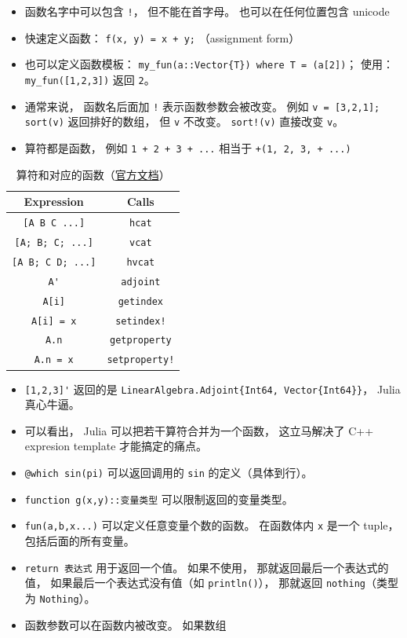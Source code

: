
\begin{issues}
\issueDraft
\end{issues}

\begin{itemize}
\item 函数名字中可以包含 \verb`!`， 但不能在首字母。 也可以在任何位置包含 unicode
\item 快速定义函数： \verb`f(x, y) = x + y;` （assignment form）
\item 也可以定义函数模板： \verb`my_fun(a::Vector{T}) where T = (a[2])`； 使用： \verb`my_fun([1,2,3])` 返回 \verb`2`。
\item 通常来说， 函数名后面加 \verb`!` 表示函数参数会被改变。 例如 \verb`v = [3,2,1]; sort(v)` 返回排好的数组， 但 \verb`v` 不改变。 \verb`sort!(v)` 直接改变 \verb`v`。
\item 算符都是函数， 例如 \verb`1 + 2 + 3 + ...` 相当于 \verb`+(1, 2, 3, + ...)`
\end{itemize}


\begin{table}[ht]
\centering
\caption{算符和对应的函数（\href{https://docs.julialang.org/en/v1/manual/functions/}{官方文档}）}\label{tab_JuFunc_1}
\begin{tabular}{|c|c|}
\hline
Expression & Calls \\
\hline
\verb`[A B C ...]` & \verb`hcat` \\
\hline
\verb`[A; B; C; ...]` & \verb`vcat` \\
\hline
\verb`[A B; C D; ...]` & \verb`hvcat` \\
\hline
\verb`A'` & \verb`adjoint` \\
\hline
\verb`A[i]` & \verb`getindex` \\
\hline
\verb`A[i] = x` & \verb`setindex!` \\
\hline
\verb`A.n` & \verb`getproperty` \\
\hline
\verb`A.n = x` & \verb`setproperty!` \\
\hline
\end{tabular}
\end{table}

\begin{itemize}
\item \verb`[1,2,3]'` 返回的是 \verb`LinearAlgebra.Adjoint{Int64, Vector{Int64}}`， Julia 真心牛逼。
\item 可以看出， Julia 可以把若干算符合并为一个函数， 这立马解决了 C++ expresion template 才能搞定的痛点。
\item \verb`@which sin(pi)` 可以返回调用的 \verb`sin` 的定义（具体到行）。
\item \verb`function g(x,y)::变量类型` 可以限制返回的变量类型。
\item \verb`fun(a,b,x...)` 可以定义任意变量个数的函数。 在函数体内 \verb`x` 是一个 tuple， 包括后面的所有变量。
\item \verb`return 表达式` 用于返回一个值。 如果不使用， 那就返回最后一个表达式的值， 如果最后一个表达式没有值（如 \verb`println()`）， 那就返回 \verb`nothing`（类型为 \verb`Nothing`）。
\item 函数参数可以在函数内被改变。 如果数组
\end{itemize}

